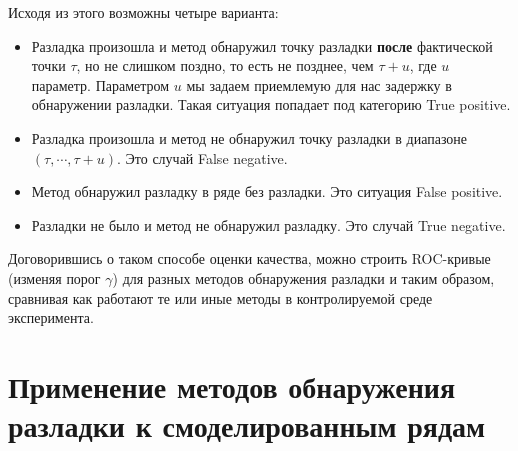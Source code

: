 \documentclass[%
12pt,
master,  %
natbib,      %
subf,        %
substylefile = spbu.rtx,
href,        %
colorlinks,  %
]{disser}
\begin{document}

Исходя из этого возможны четыре варианта:


\begin{itemize}
	\item Разладка произошла и метод обнаружил точку разладки \textbf{после} фактической точки $\tau$, но не слишком поздно, то есть не позднее, чем $\tau + u$, где $u$ параметр. Параметром $u$ мы задаем приемлемую для нас задержку в обнаружении разладки. Такая ситуация попадает под категорию True positive.
	\item Разладка произошла и метод не обнаружил точку разладки в диапазоне $(\tau, \cdots, \tau + u)$. Это случай False negative.
	\item Метод обнаружил разладку в ряде без разладки. Это ситуация False positive.
	\item Разладки не было и метод не обнаружил разладку. Это случай True negative.
\end{itemize}

Договорившись о таком способе оценки качества, можно строить ROC-кривые (изменяя порог $\gamma$) для разных методов обнаружения разладки и таким образом, сравнивая как работают те или иные методы в контролируемой среде эксперимента.


\chapter{Применение методов обнаружения разладки к смоделированным рядам}
\end{document}
